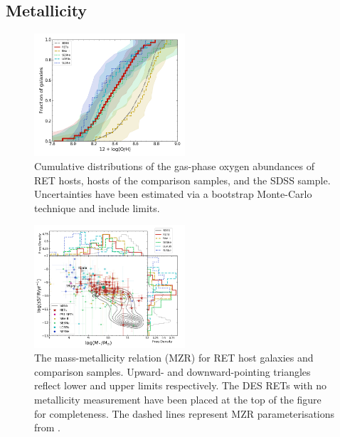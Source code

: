 \documentclass[fleqn,usenatbib,]{mnras}
\begin{document}
\subsection{Metallicity \label{subsec:res_metallicity}}

\begin{figure}
\includegraphics[width=0.5\textwidth]{figs/RET_OH_cum.png}
\caption{Cumulative distributions of the gas-phase oxygen abundances of RET hosts, hosts of the comparison samples, and the SDSS sample. Uncertainties have been estimated via a bootstrap Monte-Carlo technique and include limits.
\label{fig:oh_cum}}
\end{figure}

\begin{figure}
\includegraphics[width=0.5\textwidth]{figs/RET_MZR.png}
\caption{The mass-metallicity relation (MZR) for RET host galaxies and comparison samples. Upward- and downward-pointing triangles reflect lower and upper limits respectively. The DES RETs with no metallicity measurement have been placed at the top of the figure for completeness. The dashed lines represent MZR parameterisations from \citet{Zahid2014}.
\label{fig:mzr}}
\end{figure}
\end{document}

